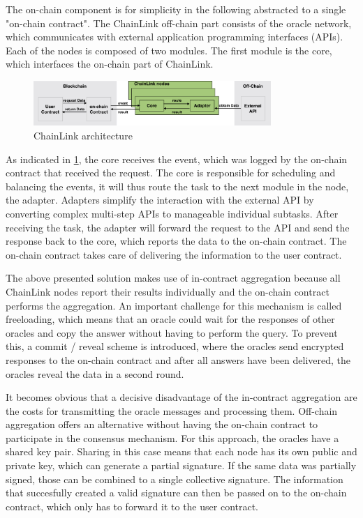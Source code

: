 \documentclass[conference]{IEEEtran}
\begin{document}
The on-chain component is for simplicity in the following abstracted to a single "on-chain contract".
The ChainLink off-chain part consists of the oracle network, which communicates with external application programming interfaces (APIs). Each of the nodes is composed of two modules. The first module is the core, which interfaces the on-chain part of ChainLink. 
\begin{figure}[h]
	\begin{center}
		\includegraphics[width=9cm]{ChainLink.png}
		\caption{ChainLink architecture}
		\label{chainlink}
	\end{center}
\end{figure}  
As indicated in \ref{chainlink}, the core receives the event, which was logged by the on-chain contract that received the request. The core is responsible for scheduling and balancing the events, it will thus route the task to the next module in the node, the adapter. Adapters simplify the interaction with the external API by converting complex multi-step APIs to manageable individual subtasks. After receiving the task, the adapter will forward the request to the API and send the response back to the core, which reports the data to the on-chain contract. The on-chain contract takes care of delivering the information to the user contract. \cite{Ellis2017} \par 
The above presented solution makes use of in-contract aggregation because all ChainLink nodes report their results individually and the on-chain contract performs the aggregation. An important challenge for this mechanism is called freeloading, which means that an oracle could wait for the responses of other oracles and copy the answer without having to perform the query. To prevent this, a commit / reveal scheme is introduced, where the oracles send encrypted responses to the on-chain contract and after all answers have been delivered, the oracles reveal the data in a second round. \cite{Ellis2017} \par 
It becomes obvious that a decisive disadvantage of the in-contract aggregation are the costs for transmitting the oracle messages and processing them. Off-chain aggregation offers an alternative without having the on-chain contract to participate in the consensus mechanism. For this approach, the oracles have a shared key pair. Sharing in this case means that each node has its own public and private key, which can generate a partial signature. If the same data was partially signed, those can be combined to a single collective signature. The information that succesfully created a valid signature can then be passed on to the on-chain contract, which only has to forward it to the user contract. \cite{Ellis2017} \par   
\end{document}
